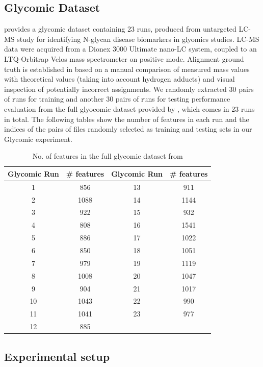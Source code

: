 \subsection{Glycomic Dataset\label{sub:glycomic-dataset}}

\cite{Tsai2013a} provides a glycomic dataset containing 23 runs, produced from untargeted LC-MS study for identifying N-glycan disease biomarkers in glyomics studies. LC-MS data were acquired from a Dionex 3000 Ultimate nano-LC system, coupled to an LTQ-Orbitrap Velos mass spectrometer on positive mode. Alignment ground truth is established in \cite{Tsai2013a} based on a manual comparison of measured mass values with theoretical values (taking into account hydrogen adducts) and visual inspection of potentially incorrect assignments. We randomly extracted 30 pairs of runs for training and another 30 pairs of runs for testing performance evaluation from the full glyocomic dataset provided by \cite{Tsai2013a}, which comes in 23 runs in total. The following tables show the number of features in each run and the indices of the pairs of files randomly selected as training and testing sets in our Glycomic experiment.

\begin{table}[!htbp]
\noindent \begin{centering}
\begin{tabular}{|c|c|c|c|}
\hline 
\textbf{Glycomic Run} & \textbf{\# features} & \textbf{Glycomic Run} & \textbf{\# features}\tabularnewline
\hline 
\hline 
1 & 856 & 13 & 911\tabularnewline
\hline 
2 & 1088 & 14 & 1144\tabularnewline
\hline 
3 & 922 & 15 & 932\tabularnewline
\hline 
4 & 808 & 16 & 1541\tabularnewline
\hline 
5 & 886 & 17 & 1022\tabularnewline
\hline 
6 & 850 & 18 & 1051\tabularnewline
\hline 
7 & 979 & 19 & 1119\tabularnewline
\hline 
8 & 1008 & 20 & 1047\tabularnewline
\hline 
9 & 904 & 21 & 1017\tabularnewline
\hline 
10 & 1043 & 22 & 990\tabularnewline
\hline 
11 & 1041 & 23 & 977\tabularnewline
\hline 
12 & 885 &  & \tabularnewline
\hline 
\end{tabular}
\par\end{centering}

\caption{No. of features in the full glycomic dataset from \cite{Tsai2013a}\label{tab:No.-of-features-glycomic}}
\end{table}

\subsection{Experimental setup\label{sub:experimental-setup}}

